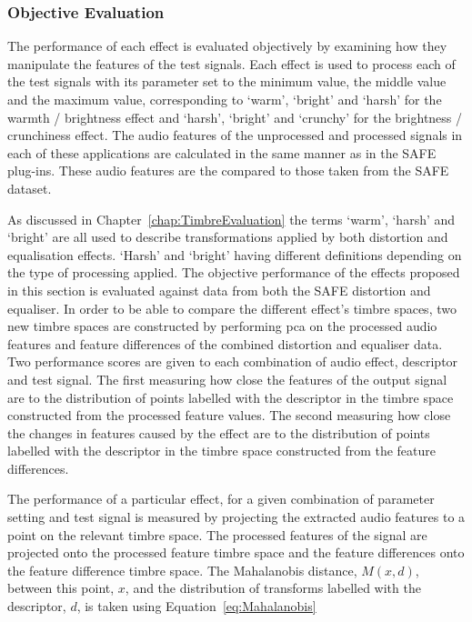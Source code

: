 		\subsubsection*{Objective Evaluation}
			The performance of each effect is evaluated objectively by examining how they manipulate the
			features of the test signals. Each effect is used to process each of the test signals with its
			parameter set to the minimum value, the middle value and the maximum value, corresponding to
			`warm', `bright' and `harsh' for the warmth / brightness effect and `harsh', `bright' and `crunchy'
			for the brightness / crunchiness effect. The audio features of the unprocessed and processed
			signals in each of these applications are calculated in the same manner as in the SAFE plug-ins.
			These audio features are the compared to those taken from the SAFE dataset.

			As discussed in Chapter~\ref{chap:TimbreEvaluation} the terms `warm', `harsh' and `bright' are all
			used to describe transformations applied by both distortion and equalisation effects. `Harsh' and
			`bright' having different definitions depending on the type of processing applied. The objective
			performance of the effects proposed in this section is evaluated against data from both the SAFE
			distortion and equaliser. In order to be able to compare the different effect's timbre spaces, two
			new timbre spaces are constructed by performing \acrshort{pca} on the processed audio features and
			feature differences of the combined distortion and equaliser data. Two performance scores are given
			to each combination of audio effect, descriptor and test signal. The first measuring how close the
			features of the output signal are to the distribution of points labelled with the descriptor in the
			timbre space constructed from the processed feature values. The second measuring how close the
			changes in features caused by the effect are to the distribution of points labelled with the
			descriptor in the timbre space constructed from the feature differences.

			The performance of a particular effect, for a given combination of parameter setting and test
			signal is measured by projecting the extracted audio features to a point on the relevant timbre
			space. The processed features of the signal are projected onto the processed feature timbre space
			and the feature differences onto the feature difference timbre space. The Mahalanobis distance,
			$M(x, d)$, between this point, $x$, and the distribution of transforms labelled with the
			descriptor, $d$, is taken using Equation~\ref{eq:Mahalanobis}
			
